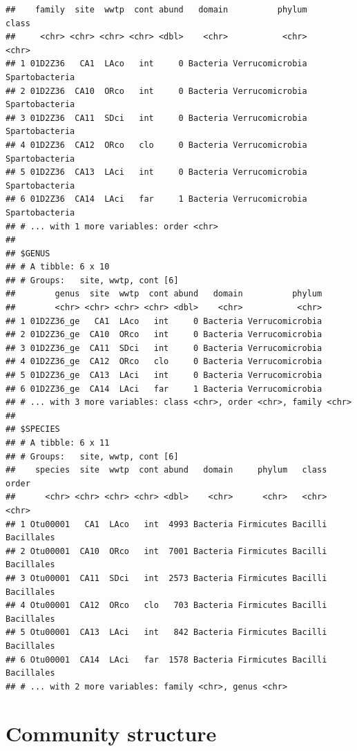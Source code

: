 \documentclass[letterpaper,12pt]{article}\usepackage[]{graphicx}\usepackage[]{color}
\makeatletter
\newenvironment{kframe}{%
 \def\at@end@of@kframe{}%
 \ifinner\ifhmode%
  \def\at@end@of@kframe{\end{minipage}}%
  \begin{minipage}{\columnwidth}%
 \fi\fi%
 \def\FrameCommand##1{\hskip\@totalleftmargin \hskip-\fboxsep
 \colorbox{shadecolor}{##1}\hskip-\fboxsep
     \hskip-\linewidth \hskip-\@totalleftmargin \hskip\columnwidth}%
 \MakeFramed {\advance\hsize-\width
   \@totalleftmargin\z@ \linewidth\hsize
   \@setminipage}}%
 {\par\unskip\endMakeFramed%
 \at@end@of@kframe}
\newenvironment{knitrout}{}{} %
\makeatother
\begin{document}
\begin{knitrout}
\begin{kframe}
\begin{verbatim}
##    family  site  wwtp  cont abund   domain          phylum          class
##     <chr> <chr> <chr> <chr> <dbl>    <chr>           <chr>          <chr>
## 1 01D2Z36   CA1  LAco   int     0 Bacteria Verrucomicrobia Spartobacteria
## 2 01D2Z36  CA10  ORco   int     0 Bacteria Verrucomicrobia Spartobacteria
## 3 01D2Z36  CA11  SDci   int     0 Bacteria Verrucomicrobia Spartobacteria
## 4 01D2Z36  CA12  ORco   clo     0 Bacteria Verrucomicrobia Spartobacteria
## 5 01D2Z36  CA13  LAci   int     0 Bacteria Verrucomicrobia Spartobacteria
## 6 01D2Z36  CA14  LAci   far     1 Bacteria Verrucomicrobia Spartobacteria
## # ... with 1 more variables: order <chr>
## 
## $GENUS
## # A tibble: 6 x 10
## # Groups:   site, wwtp, cont [6]
##        genus  site  wwtp  cont abund   domain          phylum
##        <chr> <chr> <chr> <chr> <dbl>    <chr>           <chr>
## 1 01D2Z36_ge   CA1  LAco   int     0 Bacteria Verrucomicrobia
## 2 01D2Z36_ge  CA10  ORco   int     0 Bacteria Verrucomicrobia
## 3 01D2Z36_ge  CA11  SDci   int     0 Bacteria Verrucomicrobia
## 4 01D2Z36_ge  CA12  ORco   clo     0 Bacteria Verrucomicrobia
## 5 01D2Z36_ge  CA13  LAci   int     0 Bacteria Verrucomicrobia
## 6 01D2Z36_ge  CA14  LAci   far     1 Bacteria Verrucomicrobia
## # ... with 3 more variables: class <chr>, order <chr>, family <chr>
## 
## $SPECIES
## # A tibble: 6 x 11
## # Groups:   site, wwtp, cont [6]
##    species  site  wwtp  cont abund   domain     phylum   class      order
##      <chr> <chr> <chr> <chr> <dbl>    <chr>      <chr>   <chr>      <chr>
## 1 Otu00001   CA1  LAco   int  4993 Bacteria Firmicutes Bacilli Bacillales
## 2 Otu00001  CA10  ORco   int  7001 Bacteria Firmicutes Bacilli Bacillales
## 3 Otu00001  CA11  SDci   int  2573 Bacteria Firmicutes Bacilli Bacillales
## 4 Otu00001  CA12  ORco   clo   703 Bacteria Firmicutes Bacilli Bacillales
## 5 Otu00001  CA13  LAci   int   842 Bacteria Firmicutes Bacilli Bacillales
## 6 Otu00001  CA14  LAci   far  1578 Bacteria Firmicutes Bacilli Bacillales
## # ... with 2 more variables: family <chr>, genus <chr>
\end{verbatim}
\end{kframe}
\end{knitrout}

\section{Community structure}
 
\end{document}
